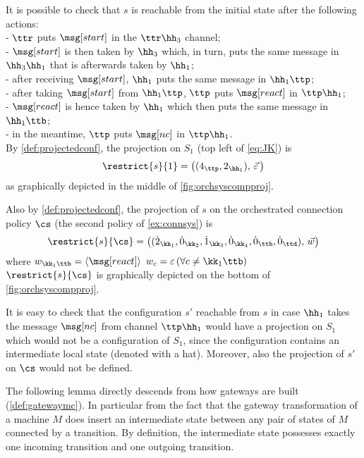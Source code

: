 \begin{example}
{It is possible to check that $s$ is reachable from the initial state after the following actions:\\[1mm] 
- $\ttr$ puts $\msg[start]$ in the $\ttr\hh_3$ channel;\\
- $\msg[start]$ is then taken by $\hh_3$ which, in turn, puts the same message in $\hh_3\hh_1$ that is afterwards taken by $\hh_1$;\\
- after receiving $\msg[start]$, $\hh_1$ puts the same message in $\hh_1\ttp$;\\
-  after taking  $\msg[start]$ from $\hh_1\ttp$, $\ttp$ puts $\msg[react]$ in $\ttp\hh_1$;\\
 - $\msg[react]$ is hence taken by $\hh_1$ which then puts the same message in $\hh_1\ttb$;\\
- in the meantime, $\ttp$ puts $\msg[nc]$ in $\ttp\hh_1$.\\



By \cref{def:projectedconf}, the projection on  $S_1$ (top left of \cref{eq:JK}) is
$$\restrict{s}{1}=\big((4_{\ttp},2_{\hh_1}),\, \vec{\varepsilon}\,\big)$$
as graphically depicted in the middle of \cref{fig:orchsyscompproj}.

Also by \cref{def:projectedconf}, the projection of $s$ on the orchestrated connection policy $\cs$ (the second policy of \cref{ex:connsys}) is
$$\restrict{s}{\cs}=\big((\dot{2}_{\kk_1},\dot{0}_{\kk_2},\dot{1}_{\kk_3},\dot{0}_{\kk_4},\dot{0}_{\ttb},\dot{0}_{\ttd}),\, \vec{w}\big)$$
where  \quad $w_{\kk_1\ttb}=\langle\msg[react]\rangle$ \quad $w_{c}=\varepsilon\, (\forall c\neq\kk_1\ttb)$\\
$\restrict{s}{\cs}$ is graphically depicted on the bottom of \cref{fig:orchsyscompproj}.

It is easy to check that the configuration $s'$ reachable from $s$ in case $\hh_1$ takes the message
$\msg[nc]$ from channel $\ttp\hh_1$ would have a projection on $S_1$ which would not be a configuration of $S_1$,
since the configuration contains an intermediate local state (denoted with a hat). 
Moreover, also the projection of $s'$ on $\cs$ would not be defined.


\finex
}
\end{example}


The following lemma
directly descends from how gateways are built (\cref{def:gatewaymc}).
In particular from the fact that the gateway transformation of a machine $M$ does insert an intermediate state
 between any pair of states of $M$ connected by a transition. By definition, the intermediate state
 possesses exactly one incoming transition and one outgoing transition. 

